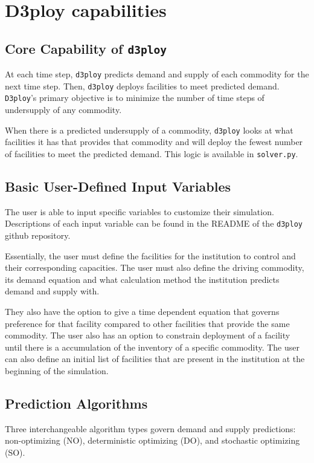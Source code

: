 \documentclass[11pt,letterpaper]{article}
\newcommand{\deploy}{\texttt{d3ploy}\xspace}%
\newcommand{\Deploy}{\texttt{D3ploy}\xspace}%
\begin{document}
\section{D3ploy capabilities}
\subsection{\textbf{Core Capability of \deploy}}
At each time step, \deploy predicts demand and supply of each 
commodity for the next time step.
Then, \deploy deploys facilities to meet predicted demand. 
\Deploy's primary objective is to minimize the number of time 
steps of undersupply of any commodity. 

When there is a predicted undersupply of a commodity, \deploy looks 
at what facilities it has that provides that commodity and 
will deploy the fewest number of facilities
to meet the predicted demand. 
This logic is available in \texttt{solver.py}. 

\subsection{\textbf{Basic User-Defined Input Variables}}
The user is able to input specific variables to customize their
simulation. 
Descriptions of each input variable can be found in the 
README of the \deploy github repository.

Essentially, the user must define the facilities for the 
institution to control and their corresponding capacities. 
The user must also define the driving commodity, its demand 
equation and what calculation method the institution predicts 
demand and supply with. 

They also have the option to give a time dependent equation that governs
preference for that facility compared to other facilities that 
provide the same commodity. 
The user also has an option to constrain deployment of a facility 
until there is a accumulation of the inventory of a specific commodity.  
The user can also define an initial list of facilities that 
are present in the institution at the beginning of the simulation. 

\subsection{\textbf{Prediction Algorithms}}
Three interchangeable algorithm types govern demand and supply 
predictions: non-optimizing (NO), deterministic optimizing (DO), and stochastic
optimizing (SO). 
\end{document}
